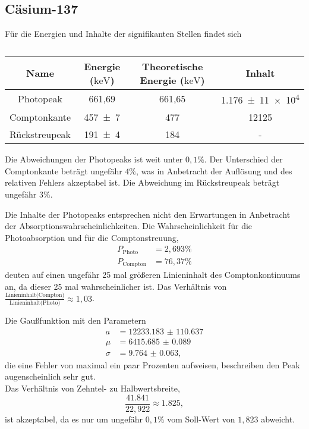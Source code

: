 \subsection{Cäsium-137}

Für die Energien und Inhalte der signifikanten Stellen findet sich
\begin{table}[H]
    \centering
    \caption{}
    \label{tab:fit}
    \begin{tabular}{c c c c}
        \toprule
        {Name} & {Energie ($\si{\kilo\electronvolt}$)} & Theoretische Energie ($\si{\kilo\electronvolt}$) & Inhalt \\
        \midrule
        {Photopeak} & 661,69 & 661,65 & \num{1,176(11)e4} \\
        {Comptonkante} & \num{457(7)} & 477 & 12125 \\
        {Rückstreupeak} & \num{191(4)} & 184 & {-} \\
        \bottomrule
    \end{tabular}
\end{table}

Die Abweichungen der Photopeaks ist weit unter $0,1 \%$. Der Unterschied der Comptonkante beträgt ungefähr $4 \%$, was in Anbetracht der Auflösung und des relativen Fehlers akzeptabel ist.
Die Abweichung im Rückstreupeak beträgt ungefähr $3 \%$. 

Die Inhalte der Photopeaks entsprechen nicht den Erwartungen in Anbetracht der Absorptionswahrscheinlichkeiten. Die Wahrscheinlichkeit für die Photoabsorption und für die Comptonstreuung,
\begin{align}
    P_\text{Photo} &= 2,693 \% \\
    P_\text{Compton} &= 76,37 \%
\end{align}
deuten auf einen ungefähr 25 mal größeren Linieninhalt des Comptonkontinuums an, da dieser 25 mal wahrscheinlicher ist.
Das Verhältnis von $\frac{\text{Linieninhalt(Compton)}}{\text{Linieninhalt(Photo)}} \approx 1,03$.


Die Gaußfunktion mit den Parametern
\begin{align}
    a &= \num{12233.183(110637)} \\
    \mu &= \num{6415.685(89)} \\
    \sigma &= \num{9.764(63)},
\end{align}
die eine Fehler von maximal ein paar Prozenten aufweisen, beschreiben den Peak augenscheinlich sehr gut. \\

Das Verhältnis von Zehntel- zu Halbwertsbreite,
\begin{equation}
    \frac{41.841}{22,922} \approx 1.825,
\end{equation}
ist akzeptabel, da es nur um ungefähr $0,1 \%$ vom Soll-Wert von $1,823$ abweicht.


